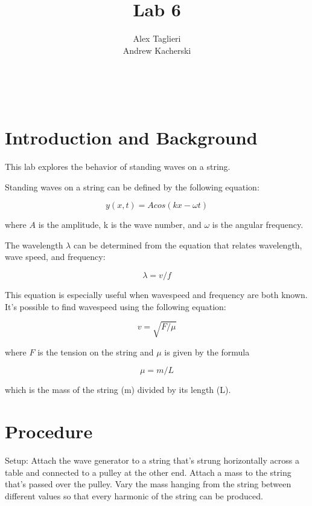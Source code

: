\documentclass[]{article}
\title{Lab 6}
\author{
	Alex Taglieri
	\\
	Andrew Kacherski
	}
\begin{document}
\maketitle
\newpage
\
\raggedright


\section{Introduction and Background}

This lab explores the behavior of standing waves on a string.

Standing waves on a string can be defined by the following equation:

\begin{equation}\label{waveEquation}
y(x,t) = Acos(kx-\omega t)
\end{equation}

where $A$ is the amplitude, k is the wave number, and $\omega$ is the angular frequency.

The wavelength $\lambda$ can be determined from the equation that relates wavelength, wave speed, and frequency:

\begin{equation}
\lambda=v/f
\end{equation}

This equation is especially useful when wavespeed and frequency are both known. It's possible to find wavespeed using the following equation:

\begin{equation}
v=\sqrt{F/\mu}
\end{equation}

where $F$ is the tension on the string and $\mu$ is given by the formula

\begin{equation}
\mu=m/L
\end{equation}

which is the mass of the string (m) divided by its length (L).



\section{Procedure}

Setup: Attach the wave generator to a string that's strung horizontally across a table and connected to a pulley at the other end. Attach a mass to the string that's passed over the pulley. Vary the mass hanging from the string between different values so that every harmonic of the string can be produced.
\newline
\end{document}
